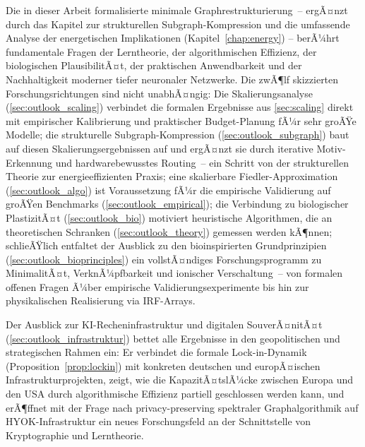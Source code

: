 ﻿\documentclass[12pt, a4paper, openany]{report}
\begin{document}
Die in dieser Arbeit formalisierte minimale Graphrestrukturierung~-- ergÃ¤nzt
durch das Kapitel zur strukturellen Subgraph-Kompression und die
umfassende Analyse der energetischen Implikationen (Kapitel~\ref{chap:energy})
-- berÃ¼hrt fundamentale Fragen der Lerntheorie, der algorithmischen Effizienz,
der biologischen PlausibilitÃ¤t, der praktischen Anwendbarkeit und der
Nachhaltigkeit moderner tiefer neuronaler Netzwerke.  Die zwÃ¶lf skizzierten
Forschungsrichtungen sind nicht unabhÃ¤ngig: Die Skalierungsanalyse
(\cref{sec:outlook_scaling}) verbindet die formalen Ergebnisse aus
\cref{sec:scaling} direkt mit empirischer Kalibrierung und praktischer
Budget-Planung fÃ¼r sehr groÃŸe Modelle; die strukturelle Subgraph-Kompression
(\cref{sec:outlook_subgraph}) baut auf diesen Skalierungsergebnissen auf
und ergÃ¤nzt sie durch iterative Motiv-Erkennung und hardwarebewusstes
Routing~-- ein Schritt von der strukturellen Theorie zur
energieeffizienten Praxis; eine skalierbare Fiedler-Approximation
(\cref{sec:outlook_algo}) ist Voraussetzung fÃ¼r die empirische Validierung
auf groÃŸen Benchmarks (\cref{sec:outlook_empirical}); die Verbindung zu
biologischer PlastizitÃ¤t (\cref{sec:outlook_bio}) motiviert heuristische
Algorithmen, die an theoretischen Schranken (\cref{sec:outlook_theory})
gemessen werden kÃ¶nnen; schlieÃŸlich entfaltet der Ausblick zu den
bioinspirierten Grundprinzipien (\cref{sec:outlook_bioprinciples}) ein
vollstÃ¤ndiges Forschungsprogramm zu MinimalitÃ¤t, VerknÃ¼pfbarkeit und
ionischer Verschaltung~-- von formalen offenen Fragen Ã¼ber empirische
Validierungsexperimente bis hin zur physikalischen Realisierung via IRF-Arrays.

Der Ausblick zur KI-Recheninfrastruktur und digitalen SouverÃ¤nitÃ¤t
(\cref{sec:outlook_infrastruktur}) bettet alle Ergebnisse in den
geopolitischen und strategischen Rahmen ein: Er verbindet die formale
Lock-in-Dynamik (Proposition~\ref{prop:lockin}) mit konkreten deutschen
und europÃ¤ischen Infrastrukturprojekten, zeigt, wie die KapazitÃ¤tslÃ¼cke
zwischen Europa und den USA durch algorithmische Effizienz partiell
geschlossen werden kann, und erÃ¶ffnet mit der Frage nach
privacy-preserving spektraler Graphalgorithmik auf HYOK-Infrastruktur
ein neues Forschungsfeld an der Schnittstelle von Kryptographie und
Lerntheorie.
\end{document}
